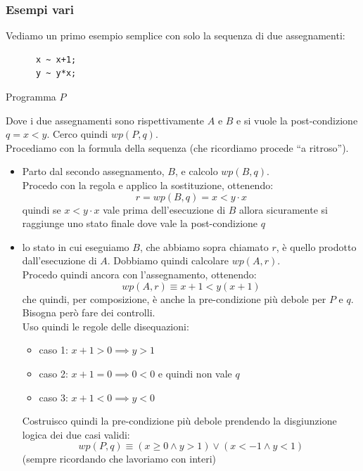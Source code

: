 				      				\subsubsection{Esempi vari}
				      				\begin{esempio}
				      					Vediamo un primo esempio semplice con solo la sequenza di due assegnamenti:
				      					\begin{listing}[H]
				      						\begin{lstlisting}
      x ~ x+1;
      y ~ y*x;
				      					\end{lstlisting}
				      					\caption{Programma $P$}
				      					\end{listing}
				      					Dove i due assegnamenti sono rispettivamente $A$ e $B$ e si vuole la
				      					post-condizione $q=x<y$. Cerco quindi $wp(P, q)$.\\
				      					Procediamo con la formula della sequenza (che ricordiamo procede ``a
				      					ritroso'').
				      					\begin{itemize}
				      						\item Parto dal secondo assegnamento, $B$, e calcolo $wp(B, q)$.\\
				      						      Procedo con la regola e applico la sostituzione, ottenendo:
				      						      \[r=wp(B, q)=x<y\cdot x\]
				      						      quindi se $x<y\cdot x$ vale prima dell'esecuzione di $B$ allora sicuramente
				      						      si raggiunge uno stato finale dove vale la post-condizione $q$ 
				      						\item lo stato in cui eseguiamo $B$, che abbiamo sopra chiamato $r$, è
				      						      quello prodotto dall'esecuzione di $A$. Dobbiamo quindi calcolare
				      						      $wp(A, r)$.\\
				      						      Procedo quindi ancora con l'assegnamento, ottenendo:
				      						      \[wp(A, r)\equiv x+1<y(x+1)\]
				      						      che quindi, per composizione, è anche la pre-condizione più debole per $P$ e
				      						      $q$. Bisogna però fare dei controlli.\\
				      						      Uso quindi le regole delle disequazioni:
				      						      \begin{itemize}
				      						      	\item caso 1: $x+1>0\implies y>1$
				      						      	\item caso 2: $x+1=0\implies 0<0$ e quindi non vale $q$
				      						      	\item caso 3: $x+1<0\implies y<0$
				      						      \end{itemize}
				      						      Costruisco quindi la pre-condizione più debole prendendo la disgiunzione
				      						      logica dei due casi validi:
				      						      \[wp(P, q)\equiv(x\geq 0\land y>1)\lor (x<-1\land y<1)\]
				      						      (sempre ricordando che lavoriamo con interi)
				      					\end{itemize}
				      				\end{esempio}
